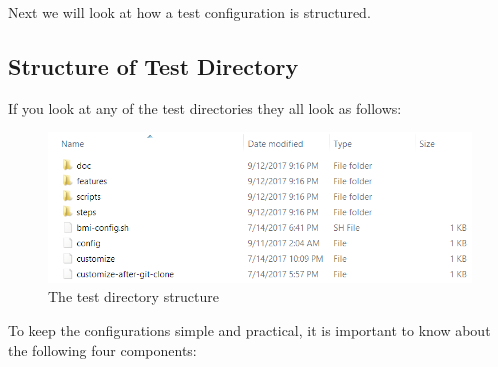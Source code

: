 Next we will look at how a test configuration is structured.

\subsection{Structure of Test Directory}

If you look at any of the test directories they all look as follows:

\begin{figure}[!h] %
\vspace{10mm}
\begin{center}
\includegraphics[scale=0.8]{figures/uat-test-dir.png}
\end{center}
\caption{The test directory structure}
\label{fig:uat-root-dir}
\end{figure}

To keep the configurations simple and practical, it is important to know about the following four components: \\

